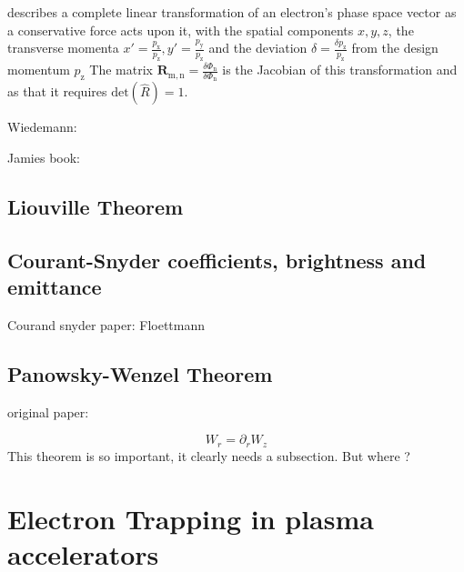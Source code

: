 describes a complete linear transformation of an electron's phase space vector as a conservative force acts upon it, with the spatial components $x,y,z$, the transverse momenta $x'=\frac{p_\mathrm{x}}{p_\mathrm{z}},y'=\frac{p_\mathrm{y}}{p_\mathrm{z}}$ and the deviation  $\delta=\frac{\delta p_\mathrm{z}}{p_\mathrm{z}}$ from the design momentum $p_\mathrm{z}$
The matrix $\mathbf{R}_\mathrm{m,n}= \frac{\delta \Phi_\mathrm{n}}{\delta \Phi_\mathrm{n}}$ is the Jacobian of this transformation and as that it requires $\mathrm{det}(\hat{R})=1$.


Wiedemann:\cite{Wiedemann_accelerator}


 Jamies book: \cite{Book_Fundamentals_Rosenzweig}
\subsection{Liouville Theorem}
\subsection{Courant-Snyder coefficients, brightness and emittance}
Courand snyder paper:\cite{COURANT1958}
Floettmann \cite{PhysRevSTAB.6.034202}
\subsection{Panowsky-Wenzel Theorem}

original paper:  \cite{Panowsky_Wenzel_original}

 \begin{equation}
W_r =\partial_r W_z
\end{equation} 
This theorem is so important, it clearly needs a subsection. But where ?


\section{Electron Trapping in plasma accelerators}

